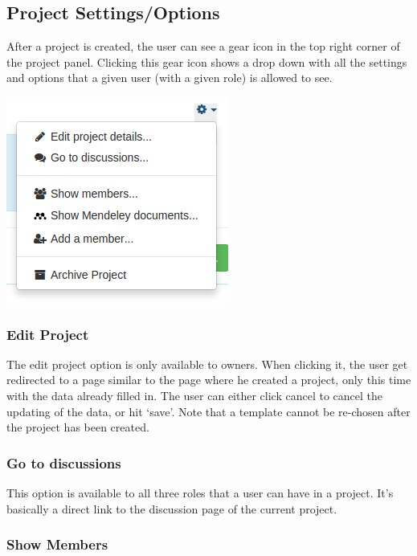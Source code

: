\subsection{Project Settings/Options}

After a project is created, the user can see a gear icon in the top right corner of the project panel. Clicking this gear icon shows a drop down
with all the settings and options that a given user (with a given role) is allowed to see.

\begin{center}
\includegraphics[scale=0.5]{./img/project_dropdown.png}
\end{center}

\subsubsection{Edit Project}

The edit project option is only available to owners. When clicking it, the user get redirected to a page similar to the page where he created a project,
only this time with the data already filled in. The user can either click cancel to cancel the updating of the data, or hit `save'. Note
that a template cannot be re-chosen after the project has been created.

\subsubsection{Go to discussions}

This option is available to all three roles that a user can have in a project. It's basically a direct link to the discussion page of the current
project.

\subsubsection{Show Members}

